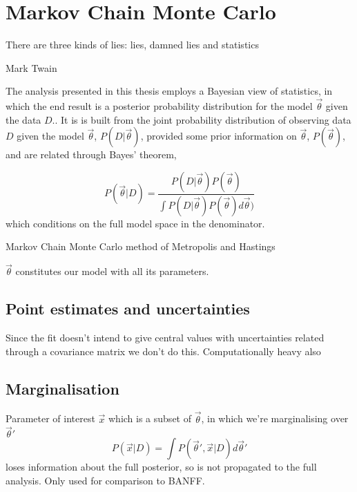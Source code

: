 \chapter{Markov Chain Monte Carlo}
\label{chap:mcmc}

\epigraph{There are three kinds of lies: lies, damned lies and statistics}{Mark Twain}

The analysis presented in this thesis employs a Bayesian view of statistics, in which the end result is a posterior probability distribution for the model $\vec{\theta}$ given the data $D$.. It is is built from the joint probability distribution of observing data $D$ given the model $\vec{\theta}$, $P(D|\vec{\theta})$, provided some prior information on $\vec{\theta}$, $P(\vec{\theta})$, and are related through Bayes' theorem,

\begin{equation}
P(\vec{\theta}|D) = \frac{P(D|\vec{\theta})P(\vec{\theta})}{\int P(D|\vec{\theta})P(\vec{\theta})d\vec{\theta})}
\label{eq:bayes}
\end{equation}
which conditions on the full model space in the denominator. 

\cite{mcmc_handbook}

\cite{bayesian_tutorial}

Markov Chain Monte Carlo method of Metropolis and Hastings\cite{metropolis,hastings}

$\vec{\theta}$ constitutes our model with all its parameters.

\section{Point estimates and uncertainties}
Since the fit doesn't intend to give central values with uncertainties related through a covariance matrix we don't do this. Computationally heavy also

\section{Marginalisation}
Parameter of interest $\vec{x}$ which is a subset of $\vec{\theta}$, in which we're marginalising over $\vec{\theta}'$
\begin{equation}
	P(\vec{x}|D) = \int P(\vec{\theta}',\vec{x}|D) d\vec{\theta}'
\end{equation}
loses information about the full posterior, so is not propagated to the full analysis. Only used for comparison to BANFF.

